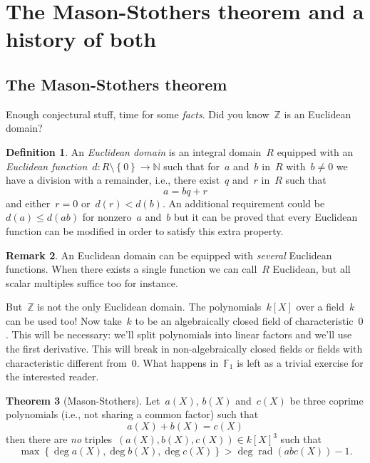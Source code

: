 \documentclass[11pt, a4paper, openany, oneside, article]{memoir}
\theoremstyle{definition}
\newtheorem{theorem}{Theorem}
\newtheorem{definition}[theorem]{Definition}
\newtheorem{remark}[theorem]{Remark}
\DeclareMathOperator\rad{rad}
\begin{document}
\clearpage


\section{The Mason-Stothers theorem and a history of both}
\label{section:mason-stothers}

\subsection{The Mason-Stothers theorem}

Enough conjectural stuff, time for some \emph{facts}. Did you know~$\mathbb{Z}$ is an Euclidean domain?

\begin{definition}
  An \emph{Euclidean domain} is an integral domain~$R$ equipped with an \emph{Euclidean function}~$d\colon R\setminus\left\{ 0 \right\}\to\mathbb{N}$ such that for~$a$ and~$b$ in~$R$ with~$b\neq 0$ we have a division with a remainder, i.e., there exist~$q$ and~$r$ in~$R$ such that
  \begin{equation}
    a=bq+r
  \end{equation}
  and either~$r=0$ or~$d(r)<d(b)$. An additional requirement could be~$d(a)\leq d(ab)$ for nonzero~$a$ and~$b$ but it can be proved that every Euclidean function can be modified in order to satisfy this extra property.
\end{definition}

\begin{remark}
  An Euclidean domain can be equipped with \emph{several} Euclidean functions. When there exists a single function we can call~$R$ Euclidean, but all scalar multiples suffice too for instance.
\end{remark}

But~$\mathbb{Z}$ is not the only Euclidean domain. The polynomials~$k[X]$ over a field~$k$ can be used too! Now take~$k$ to be an algebraically closed field of characteristic~$0$. This will be necessary: we'll split polynomials into linear factors and we'll use the first derivative. This will break in non-algebraically closed fields or fields with characteristic different from~$0$. What happens in~$\mathbb{F}_1$ is left as a trivial exercise for the interested reader.

\begin{theorem}[Mason-Stothers]
  \label{theorem:mason-stothers}
  Let~$a(X)$, $b(X)$ and~$c(X)$ be three coprime polynomials (i.e., not sharing a common factor) such that
  \begin{equation}
    \label{equation:mason-stothers-equality}
    a(X)+b(X)=c(X)
  \end{equation}
  then there are \emph{no} triples~$(a(X),b(X),c(X))\in k[X]^3$ such that
  \begin{equation}
    \max\left\{ \deg a(X),\deg b(X),\deg c(X) \right\}>\deg\rad(abc(X))-1.
  \end{equation}
\end{theorem}
\end{document}
